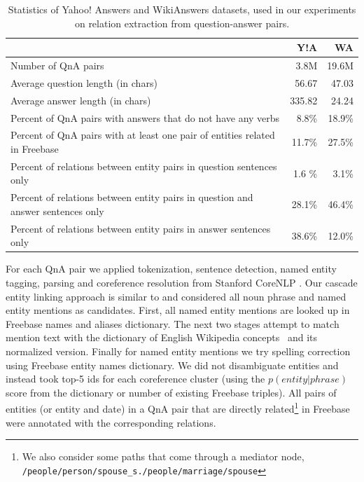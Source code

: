 \begin{table}
\centering
\footnotesize
\begin{tabular}{p{10.5cm}|rr}
& Y!A & WA\\
\hline
Number of QnA pairs & 3.8M & 19.6M \\
Average question length (in chars) & 56.67 & 47.03 \\
Average answer length (in chars) & 335.82 & 24.24 \\
Percent of QnA pairs with answers that do not have any verbs & 8.8\% & 18.9\% \\
Percent of QnA pairs with at least one pair of entities related in Freebase & 11.7\% & 27.5\% \\
Percent of relations between entity pairs in question sentences only & 1.6 \% & 3.1\% \\
Percent of relations between entity pairs in question and answer sentences only & 28.1\% & 46.4\% \\
Percent of relations between entity pairs in answer sentences only & 38.6\%& 12.0\%\\
\end{tabular}
\caption{Statistics of Yahoo! Answers and WikiAnswers datasets, used in our experiments on relation extraction from question-answer pairs.}
\label{table:factoid:cqarelextract:cqastats}
\end{table}

For each QnA pair we applied tokenization, sentence detection, named entity tagging, parsing and coreference resolution from Stanford CoreNLP \cite{manning-EtAl:2014:P14-5}.
Our cascade entity linking approach is similar to \cite{chang2011stanford} and considered all noun phrase and named entity mentions as candidates.
First, all named entity mentions are looked up in Freebase names and aliases dictionary.
The next two stages attempt to match mention text with the dictionary of English Wikipedia concepts~\cite{SPITKOVSKY12.266} and its normalized version.
Finally for named entity mentions we try spelling correction using Freebase entity names dictionary.
We did not disambiguate entities and instead took top-5 ids for each coreference cluster (using the $p(entity|phrase)$ score from the dictionary or number of existing Freebase triples).
All pairs of entities (or entity and date) in a QnA pair that are directly related\footnote{We also consider some paths that come through a mediator node, \eg \texttt{/people/person/spouse\_s./people/marriage/spouse}} in Freebase were annotated with the corresponding relations.

